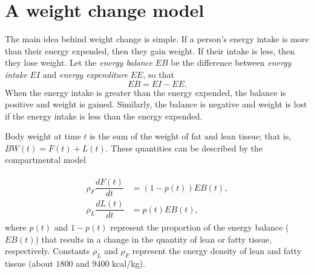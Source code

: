 \label{lab:Weightchange}



\section*{A weight change model}
The main idea behind weight change is simple.
If a person's energy intake is more than their energy expended, then they gain weight.
If their intake is less, then they lose weight.
Let the \emph{energy balance} $EB$ be the difference between \emph{energy intake} $EI$ and \emph{energy expenditure} $EE$, so that
\begin{equation}
\label{eqn:EB}
EB = EI - EE.
\end{equation}
When the energy intake is greater than the energy expended, the balance is positive and weight is gained.
Similarly, the balance is negative and weight is lost if the energy intake is less than the energy expended.

Body weight at time $t$ is the sum of the weight of fat and lean tissue; that is,  $BW(t) = F(t) + L(t).$
These quantities can be described by the compartmental model



\begin{align}
	\begin{split}
		\rho_F \dfrac{dF(t)}{dt} &= (1-p(t)) EB(t),\\
		\rho_L \dfrac{dL(t)}{dt} &= p(t) EB(t),
	\end{split}\label{eqn:compartment}
\end{align}
where $p(t)$ and $1-p(t)$ represent the proportion of the energy balance ($EB(t)$) that results in a change in the quantity of lean or fatty tissue, respectively.
Constants $\rho_L$ and $\rho_F$ represent the energy density of lean and fatty tissue (about $1800$ and $9400$ kcal/kg).

